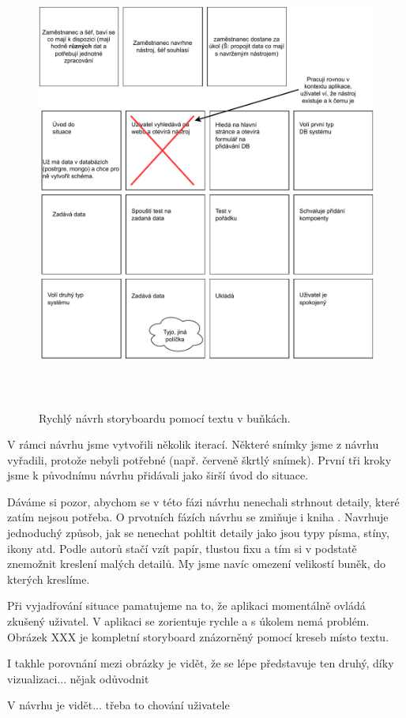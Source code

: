 \begin{figure}[htb]
    \centering
    \includegraphics[height=150mm]{../img/storyboard-1-rychly-navrh}
    \caption{Rychlý návrh storyboardu pomocí textu v buňkách.}
    \label{obr04:storyboard-1-text}
\end{figure}

V rámci návrhu jsme vytvořili několik iterací. Některé snímky jsme z návrhu vyřadili, protože nebyli potřebné (např. červeně škrtlý snímek). První tři kroky jsme k původnímu návrhu přidávali jako širší úvod do situace.

Dáváme si pozor, abychom se v této fázi návrhu nenechali strhnout detaily, které zatím nejsou potřeba. O prvotních fázích návrhu se zmiňuje i kniha \cite{Refactoring_UI}. Navrhuje jednoduchý způsob, jak se nenechat pohltit detaily jako jsou typy písma, stíny, ikony atd. Podle autorů stačí vzít papír, tlustou fixu a tím si v podstatě znemožnit kreslení malých detailů. My jsme navíc omezení velikostí buněk, do kterých kreslíme.

Při vyjadřování situace pamatujeme na to, že aplikaci momentálně ovládá zkušený uživatel. V  aplikaci se zorientuje rychle a s úkolem nemá problém. Obrázek XXX je kompletní storyboard znázorněný pomocí kreseb místo textu.

I takhle porovnání mezi obrázky je vidět, že se lépe představuje ten druhý, díky vizualizaci... nějak odůvodnit

V návrhu je vidět... třeba to chování uživatele


